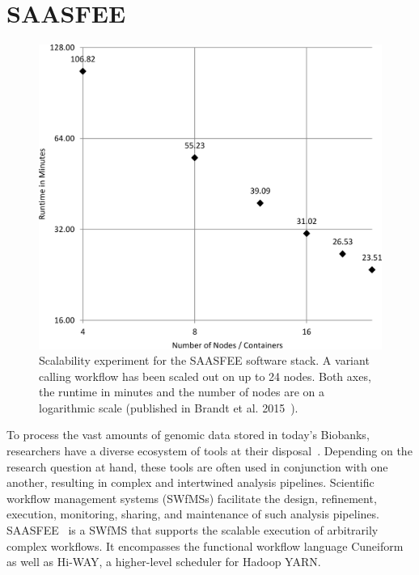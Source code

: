 \section{SAASFEE}
\label{saasfee}


\begin{figure}
  \centering
  \includegraphics[width=.7\textwidth]{imgs/wf_runtime.png}
  \caption{Scalability experiment for the SAASFEE software stack. A variant calling workflow has been scaled out on up to 24 nodes. Both axes, the runtime in minutes and the number of nodes are on a logarithmic scale (published in Brandt et al. 2015~\cite{Brandt2015}).}
  \label{fig:saasfee_scaling}
\end{figure}

To process the vast amounts of genomic data stored in today's Biobanks, researchers have a diverse ecosystem of tools at their disposal~\cite{Pabinger2014}. Depending on the research question at hand, these tools are often used in conjunction with one another, resulting in complex and intertwined analysis pipelines. Scientific workflow management systems (SWfMSs) facilitate the design, refinement, execution, monitoring, sharing, and maintenance of such analysis pipelines. SAASFEE~\cite{vldb_demo} is a SWfMS that supports the scalable execution of arbitrarily complex workflows. It encompasses the functional workflow language Cuneiform as well as Hi-WAY, a higher-level scheduler for Hadoop YARN.


